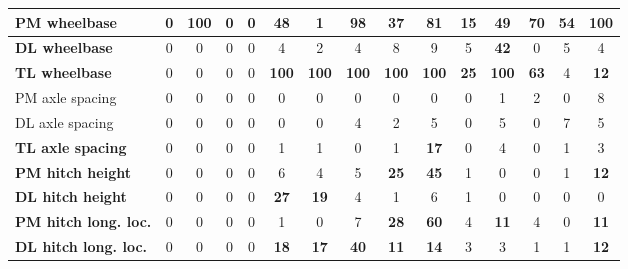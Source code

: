 \begin{table}[H]
\begin{tabular}{|l|c|c|c|c|c|c|c|c|c|c|c|c|c|c|}
\hline
\textcolor[rgb]{0.851, 0.373, 0.008}{\textbf{PM wheelbase}} & 0 & \textcolor[rgb]{0.835, 0.369, 0.000}{\textbf{100}} & 0 & 0 & \textcolor[rgb]{0.000, 0.620, 0.451}{\textbf{48}} & 1 & \textcolor[rgb]{0.000, 0.447, 0.698}{\textbf{98}} & \textcolor[rgb]{0.000, 0.620, 0.451}{\textbf{37}} & \textcolor[rgb]{0.000, 0.447, 0.698}{\textbf{81}} & \textbf{15} & \textcolor[rgb]{0.000, 0.620, 0.451}{\textbf{49}} & \textcolor[rgb]{0.000, 0.447, 0.698}{\textbf{70}} & \textcolor[rgb]{0.000, 0.447, 0.698}{\textbf{54}} & \textcolor[rgb]{0.835, 0.369, 0.000}{\textbf{100}} \\
\hline
\textcolor[rgb]{0.000, 0.620, 0.451}{\textbf{DL wheelbase}} & 0 & 0 & 0 & 0 & 4 & 2 & 4 & 8 & 9 & 5 & \textcolor[rgb]{0.000, 0.620, 0.451}{\textbf{42}} & 0 & 5 & 4 \\
\hline
\textcolor[rgb]{0.851, 0.373, 0.008}{\textbf{TL wheelbase}} & 0 & 0 & 0 & 0 & \textcolor[rgb]{0.835, 0.369, 0.000}{\textbf{100}} & \textcolor[rgb]{0.835, 0.369, 0.000}{\textbf{100}} & \textcolor[rgb]{0.835, 0.369, 0.000}{\textbf{100}} & \textcolor[rgb]{0.835, 0.369, 0.000}{\textbf{100}} & \textcolor[rgb]{0.835, 0.369, 0.000}{\textbf{100}} & \textcolor[rgb]{0.000, 0.620, 0.451}{\textbf{25}} & \textcolor[rgb]{0.835, 0.369, 0.000}{\textbf{100}} & \textcolor[rgb]{0.000, 0.447, 0.698}{\textbf{63}} & 4 & \textbf{12} \\
\hline
PM axle spacing & 0 & 0 & 0 & 0 & 0 & 0 & 0 & 0 & 0 & 0 & 1 & 2 & 0 & 8 \\
\hline
DL axle spacing & 0 & 0 & 0 & 0 & 0 & 0 & 4 & 2 & 5 & 0 & 5 & 0 & 7 & 5 \\
\hline
\textbf{TL axle spacing} & 0 & 0 & 0 & 0 & 1 & 1 & 0 & 1 & \textbf{17} & 0 & 4 & 0 & 1 & 3 \\
\hline
\textcolor[rgb]{0.000, 0.620, 0.451}{\textbf{PM hitch height}} & 0 & 0 & 0 & 0 & 6 & 4 & 5 & \textcolor[rgb]{0.000, 0.620, 0.451}{\textbf{25}} & \textcolor[rgb]{0.000, 0.620, 0.451}{\textbf{45}} & 1 & 0 & 0 & 1 & \textbf{12} \\
\hline
\textcolor[rgb]{0.000, 0.620, 0.451}{\textbf{DL hitch height}} & 0 & 0 & 0 & 0 & \textcolor[rgb]{0.000, 0.620, 0.451}{\textbf{27}} & \textbf{19} & 4 & 1 & 6 & 1 & 0 & 0 & 0 & 0 \\
\hline
\textcolor[rgb]{0.000, 0.447, 0.698}{\textbf{PM hitch long. loc.}} & 0 & 0 & 0 & 0 & 1 & 0 & 7 & \textcolor[rgb]{0.000, 0.620, 0.451}{\textbf{28}} & \textcolor[rgb]{0.000, 0.447, 0.698}{\textbf{60}} & 4 & \textbf{11} & 4 & 0 & \textbf{11} \\
\hline
\textcolor[rgb]{0.000, 0.620, 0.451}{\textbf{DL hitch long. loc.}} & 0 & 0 & 0 & 0 & \textbf{18} & \textbf{17} & \textcolor[rgb]{0.000, 0.620, 0.451}{\textbf{40}} & \textbf{11} & \textbf{14} & 3 & 3 & 1 & 1 & \textbf{12} \\

\end{tabular}
\end{table}
